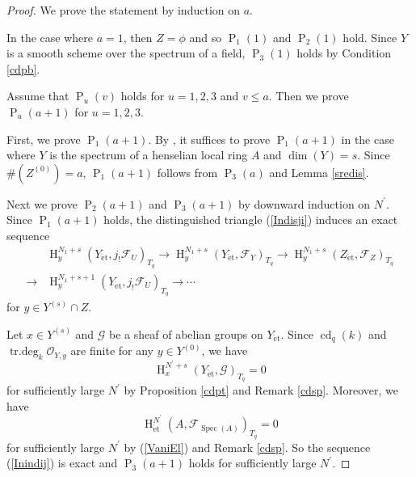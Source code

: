 \documentclass{article}
\newcommand{\spec}{\operatorname{Spec}}
\newcommand{\et}{\mathrm{\acute{e}t}}
\newcommand{\HO}{\operatorname{H}}
\begin{document}
%

%
\begin{proof}\upshape
We prove the statement by induction on $a$.

In the case where $a=1$,
then $Z=\phi$ and so $\operatorname{P}_{1}(1)$ and $\operatorname{P}_{2}(1)$ hold. 
Since 
$Y$ is a smooth scheme over the spectrum of a field,
$\operatorname{P}_{3}(1)$ holds by Condition
\ref{cdpb}.

Assume that $\operatorname{P}_{u}(v)$ holds for
$u=1, 2, 3$ and
$v\leq a$. Then we prove
$\operatorname{P}_{u}(a+1)$ for $u=1, 2, 3$.

First, we prove $\operatorname{P}_{1}(a+1)$.  
By \cite[p.93, III, Corollary 1.28]{M},
it suffices to prove $\operatorname{P}_{1}(a+1)$
in the case where $Y$ is the spectrum of a henselian local
ring $A$ and $\operatorname{dim}(Y)=s$.
Since $\#(Z^{(0)})=a$, $\operatorname{P}_{1}(a+1)$ follows from
$\operatorname{P}_{3}(a)$
and Lemma \ref{sredis}.

Next we prove $\operatorname{P}_{2}(a+1)$
and $\operatorname{P}_{3}(a+1)$
by downward induction on $N^{\prime}$.
Since $\operatorname{P}_{1}(a+1)$ holds, 
the distinguished triangle (\ref{Indisji})
induces an exact sequence
%
\begin{align}\label{FN1ex}
&\HO_{y}^{N_{1}+s}(Y_{\et}, j_{!}\mathcal{F}_{U})_{T_{q}}
\to 
\HO_{y}^{N_{1}+s}(Y_{\et}, \mathcal{F}_{Y})_{T_{q}}
\to
\HO_{y}^{N_{1}+s}(Z_{\et}, \mathcal{F}_{Z})_{T_{q}}
\nonumber
\\
\to 
&
\HO_{y}^{N_{1}+s+1}(Y_{\et}, j_{!}\mathcal{F}_{U})_{T_{q}}
\to \cdots
\end{align}
%
for $y\in Y^{(s)}\cap Z$.

Let
$x\in Y^{(s)}$ and $\mathcal{G}$ be a sheaf of abelian groups 
on $Y_{\et}$.
Since $\operatorname{cd}_{q}(k)$
and $\operatorname{tr.deg}_{k}\mathcal{O}_{Y, y}$ are finite
for any $y\in Y^{(0)}$,
we have
%
\begin{equation*}
\HO^{N^{\prime}+s}_{x}(Y_{\et}, 
\mathcal{G})_{T_{q}}
=0
\end{equation*}
%
for sufficiently large $N^{\prime}$ 
by Proposition \ref{cdpt} and Remark \ref{cdsp}. 
Moreover, we have
%
\begin{equation*}
\HO^{N^{\prime}}_{\et}(A, \mathcal{F}_{\spec(A)})_{T_{q}}=0    
\end{equation*}
%
for sufficiently large $N^{\prime}$
by (\ref{VaniEl}) and Remark \ref{cdsp}. So
the sequence (\ref{Inindij}) is exact
and $\operatorname{P}_{3}(a+1)$ holds
for sufficiently large $N^{\prime}$.


\end{proof}
\end{document}

